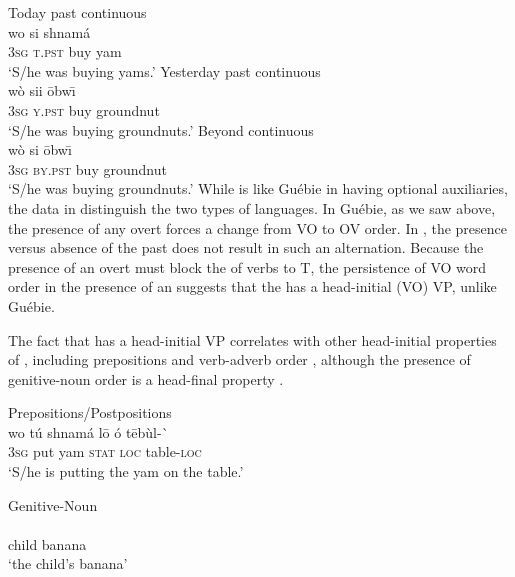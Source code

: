 \documentclass[output=paper]{LSP/langsci}
\begin{document}
\ea \label{ex:11:gwari}
\ea  Today past continuous	\\
\gll wo  si shnam\'a\\
3\textsc{sg} \textsc{t.pst} buy yam \\
\glt `S/he was buying yams.' \hfill \citep[][54]{hyman1970}
\ex Yesterday past continuous	\\
\gll w\`o  sii {\=obw\=\i }\\
3\textsc{sg} \textsc{y.pst} buy groundnut\\
\glt `S/he was buying groundnuts.' \hfill \citep[][54]{hyman1970}
\ex Beyond  continuous	\\
\gll w\`o  si {\=obw\=\i } \\
3\textsc{sg} \textsc{by.pst} buy groundnut \\
\glt `S/he was buying groundnuts.' \hfill \citep[][54]{hyman1970}
\z
\z
While  is like Gu\'ebie in having optional auxiliaries, the data in  distinguish the two types of languages. In Gu\'ebie, as we saw above, the presence of any overt  forces a change from VO to OV order. In , the presence versus absence of the past  does not result in such an alternation. Because the presence of an overt  must block the  of verbs to T, the persistence of VO word order in the presence of an  suggests that the  has a head-initial (VO) VP, unlike Gu\'ebie.

The fact that  has a head-initial VP correlates with other head-initial properties of , including prepositions  and verb-adverb order , although the presence of genitive-noun order is a head-final property . 

\ea
\ea  \label{ex:12a:gwari} {Prepositions/Postpositions}\\
\gll wo t\'u shnam\'a l\=o \'o t\=eb\`ul-\`{} \\
3\textsc{sg} put yam \textsc{stat} \textsc{loc} table-\textsc{loc} \\
\glt `S/he is putting the yam on the table.'

\ex \label{ex:12b:gwari} {Genitive-Noun}\\
\gll {} \\
child banana \\
\glt `the child's banana' \hfill \citep[][25]{hyman1970}
\end{document}
